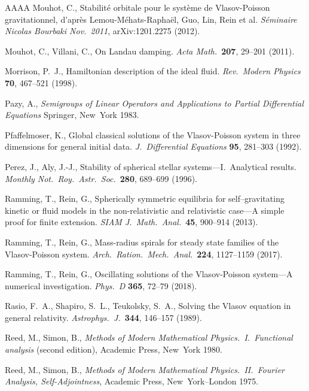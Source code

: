 \documentclass[11pt]{article}
\begin{document}
\begin{thebibliography}{AAAA}
  {\sc Mouhot, C.},
  Stabilit\'{e} orbitale pour le syst\`{e}me de Vlasov-Poisson gravitationnel,
  d'apr\`{e}s Lemou-M\'{e}hats-Rapha\"el, Guo, Lin, Rein et al.
  {\em S\'{e}minaire Nicolas Bourbaki Nov.~2011}, arXiv:1201.2275 (2012).

  {\sc Mouhot, C., Villani, C.},
  On Landau damping.
  {\em Acta Math.}\
  {\bf 207}, 29--201 (2011).

  {\sc Morrison, P.~J.},
  Hamiltonian description of the ideal fluid.
  {\em Rev.\ Modern Physics}
  {\bf 70}, 467--521 (1998).

  {\sc Pazy, A.},
  {\em Semigroups of Linear Operators and Applications to Partial
    Differential Equations}
  Springer, New~York 1983.

  {\sc Pfaffelmoser, K.},
  Global classical solutions of the Vlasov-Poisson system in three
  dimensions for general initial data.
  {\em J.~Differential Equations} 
  {\bf 95}, 281--303 (1992).

  {\sc Perez, J., Aly, J.-J.},
  Stability of spherical stellar systems---I.~Analytical results.
  {\em Monthly Not.\ Roy.\ Astr.\ Soc.}\ 
  {\bf 280}, 689--699 (1996). 

  {\sc Ramming, T., Rein, G.},
  Spherically symmetric equilibria for self--grav\-itating
  kinetic or fluid models in the non-relativistic and
  relativistic case---A simple proof for finite extension.
  {\em SIAM J.\ Math.\ Anal.}\ 
  {\bf 45}, 900--914 (2013).

  {\sc Ramming, T., Rein, G.},
  Mass-radius spirals for steady state families of the 
  Vlasov-Poisson system.
  {\em Arch.\ Ration.\ Mech.\ Anal.}\ 
  {\bf 224}, 1127--1159 (2017).

\bibitem{RaRe2018} %
  {\sc Ramming, T., Rein, G.},
  Oscillating solutions of the Vlasov-Poisson system---A numerical
  investigation.
  {\em Phys.\ D}
  {\bf 365}, 72--79 (2018).
  
  {\sc Rasio, F.~A., Shapiro, S.~L., Teukolsky, S.~A.},
  Solving the Vlasov equation in general relativity.
  {\em Astrophys.\ J.}\ 
  {\bf 344}, 146--157 (1989).

\bibitem{ReSi1} %
  {\sc Reed, M., Simon, B.},
  \textit{Methods of Modern Mathematical Physics.\ I.\
    Functional analysis} (second edition), 
  Academic Press, New~York 1980.

\bibitem{ReSi2} %
  {\sc Reed, M., Simon, B.},
  \textit{Methods of Modern Mathematical Physics.\ II.\
    Fourier Analysis, Self-Adjointness}, 
  Academic Press, New~York--London 1975.


\end{thebibliography}
\end{document}
